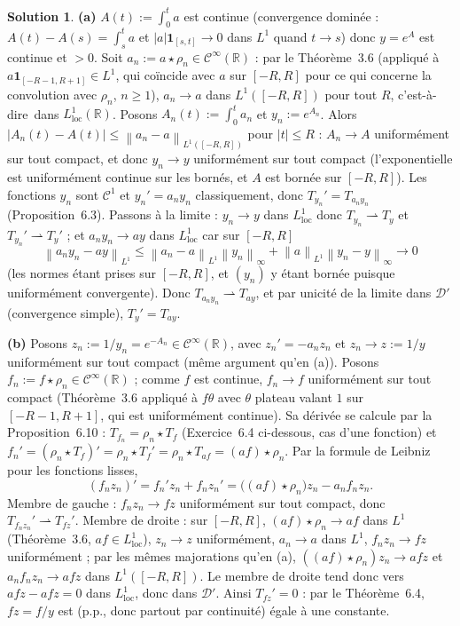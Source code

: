 \documentclass[11pt,a4paper]{article}
\newcommand{\R}{\mathbb{R}}
\newcommand{\norm}[1]{\left\|#1\right\|}
\newcommand{\Cinf}{\mathcal{C}^\infty}
\newcommand{\ie}{c'est-à-dire}
\newcommand{\D}{\mathcal{D}}
\theoremstyle{definition}
\newtheorem*{solution}{Solution}
\begin{document}
\begin{solution}
\noindent\textbf{(a)} $A(t):=\int_0^ta$ est continue (convergence dominée : $A(t)-A(s)=\int_s^ta$ et $|a|\mathbf 1_{[s,t]}\to0$ dans $L^1$ quand $t\to s$) donc $y=e^A$ est continue et $>0$. Soit $a_n:=a\star\rho_n\in\Cinf(\R)$ : par le Théorème~3.6 (appliqué à $a\mathbf 1_{[-R-1,R+1]}\in L^1$, qui coïncide avec $a$ sur $[-R,R]$ pour ce qui concerne la convolution avec $\rho_n$, $n\ge1$), $a_n\to a$ dans $L^1([-R,R])$ pour tout $R$, \ie\ dans $L^1_{\mathrm{loc}}(\R)$. Posons $A_n(t):=\int_0^ta_n$ et $y_n:=e^{A_n}$. Alors $|A_n(t)-A(t)|\le\norm{a_n-a}_{L^1([-R,R])}$ pour $|t|\le R$ : $A_n\to A$ uniformément sur tout compact, et donc $y_n\to y$ uniformément sur tout compact (l'exponentielle est uniformément continue sur les bornés, et $A$ est bornée sur $[-R,R]$). Les fonctions $y_n$ sont $\mathcal C^1$ et $y_n'=a_ny_n$ classiquement, donc $T_{y_n}'=T_{a_ny_n}$ (Proposition~6.3). Passons à la limite : $y_n\to y$ dans $L^1_{\mathrm{loc}}$ donc $T_{y_n}\rightharpoonup T_y$ et $T_{y_n}'\rightharpoonup T_y'$ ; et $a_ny_n\to ay$ dans $L^1_{\mathrm{loc}}$ car sur $[-R,R]$
\[
\norm{a_ny_n-ay}_{L^1}\le\norm{a_n-a}_{L^1}\norm{y_n}_\infty+\norm a_{L^1}\norm{y_n-y}_\infty\to0
\]
(les normes étant prises sur $[-R,R]$, et $(y_n)$ y étant bornée puisque uniformément convergente). Donc $T_{a_ny_n}\rightharpoonup T_{ay}$, et par unicité de la limite dans $\D'$ (convergence simple), $T_y'=T_{ay}$.

\medskip
\noindent\textbf{(b)} Posons $z_n:=1/y_n=e^{-A_n}\in\Cinf(\R)$, avec $z_n'=-a_nz_n$ et $z_n\to z:=1/y$ uniformément sur tout compact (même argument qu'en (a)). Posons $f_n:=f\star\rho_n\in\Cinf(\R)$ ; comme $f$ est continue, $f_n\to f$ uniformément sur tout compact (Théorème~3.6 appliqué à $f\theta$ avec $\theta$ plateau valant $1$ sur $[-R-1,R+1]$, qui est uniformément continue). Sa dérivée se calcule par la Proposition~6.10 : $T_{f_n}=\rho_n\star T_f$ (Exercice~6.4 ci-dessous, cas d'une fonction) et $f_n'=(\rho_n\star T_f)'=\rho_n\star T_f'=\rho_n\star T_{af}=(af)\star\rho_n$. Par la formule de Leibniz pour les fonctions lisses,
\[
(f_nz_n)'=f_n'z_n+f_nz_n'=\big((af)\star\rho_n\big)z_n-a_nf_nz_n .
\]
Membre de gauche : $f_nz_n\to fz$ uniformément sur tout compact, donc $T_{f_nz_n}'\rightharpoonup T_{fz}'$. Membre de droite : sur $[-R,R]$, $(af)\star\rho_n\to af$ dans $L^1$ (Théorème~3.6, $af\in L^1_{\mathrm{loc}}$), $z_n\to z$ uniformément, $a_n\to a$ dans $L^1$, $f_nz_n\to fz$ uniformément ; par les mêmes majorations qu'en (a), $((af)\star\rho_n)z_n\to afz$ et $a_nf_nz_n\to afz$ dans $L^1([-R,R])$. Le membre de droite tend donc vers $afz-afz=0$ dans $L^1_{\mathrm{loc}}$, donc dans $\D'$. Ainsi $T_{fz}'=0$ : par le Théorème~6.4, $fz=f/y$ est (p.p., donc partout par continuité) égale à une constante.
\end{solution}
\end{document}
